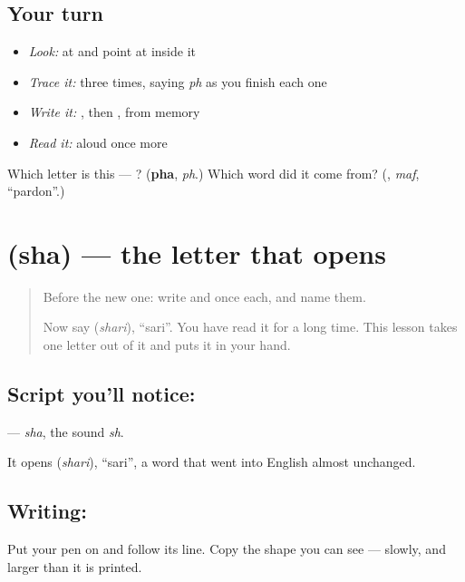 \subsection*{Your turn}
\begin{itemize}
\raggedright
  \item \emph{Look:} at \textbf{} and point at  inside it
  \item \emph{Trace it:}  three times, saying \emph{ph} as you finish each one
  \item \emph{Write it:} , then , from memory
  \item \emph{Read it:} \textbf{} aloud once more
\end{itemize}

\begin{tcolorbox}[breakable,colback=teal!4,colframe=teal!35!black,title={Before you move on}]
Which letter is this — ? (\textbf{pha}, \emph{ph}.) Which word did it come from? (\textbf{}, \emph{maf}, \textquotedblleft{}pardon\textquotedblright{}.)
\end{tcolorbox}
\section[\texorpdfstring{\bn{শ} (sha)}{শ (sha)}]{ (sha) — the letter that opens }

\label{lesson:BN-W41-sha}



\begin{quote}
Before the new one: write  and  once each, and name them.

Now say \textbf{} (\emph{shari}), \textquotedblleft{}sari\textquotedblright{}. You have read it for a long time. This lesson takes one letter out of it and puts it in your hand.
\end{quote}

\subsection*{Script you'll notice: }
\textbf{} — \emph{sha}, the sound \emph{sh}.

It opens \textbf{} (\emph{shari}), \textquotedblleft{}sari\textquotedblright{}, a word that went into English almost unchanged.

\subsection*{Writing: }
Put your pen on  and follow its line. Copy the shape you can see — slowly, and larger than it is printed.

